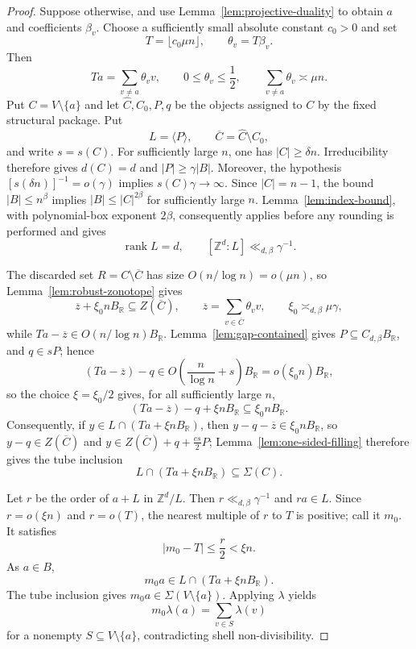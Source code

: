 \documentclass[11pt,reqno]{amsart}
\theoremstyle{definition}
\theoremstyle{remark}
\newcommand{\Z}{\mathbb Z}
\newcommand{\R}{\mathbb R}
\newcommand{\SigmaSet}{\Sigma}
\begin{document}
\begin{proof}
Suppose otherwise, and use Lemma~\ref{lem:projective-duality} to obtain
$a$ and coefficients $\beta_v$.  Choose a sufficiently small absolute
constant $c_0>0$ and set
\[
 T=\lfloor c_0\mu n\rfloor,
 \qquad
 \theta_v=T\beta_v.
\]
Then
\[
 Ta=\sum_{v\ne a}\theta_vv,
 \qquad
 0\le\theta_v\le\frac12,
 \qquad
 \sum_{v\ne a}\theta_v\asymp\mu n.
\]
Put $C=V\setminus\{a\}$ and let
$\widehat C,C_0,P,q$ be the objects assigned to $C$ by the fixed structural
package.  Put
\[
 L=\langle P\rangle,
 \qquad
 \overline C=\widehat C\setminus C_0,
\]
and write $s=s(C)$.  For sufficiently large $n$, one has $|C|\ge\delta n$.  Irreducibility therefore gives $d(C)=d$ and $|P|\ge\gamma|B|$.  Moreover, the hypothesis $[s(\delta n)]^{-1}=o(\gamma)$ implies
$s(C)\gamma\to\infty$.  Since $|C|=n-1$, the bound $|B|\le n^\beta$
implies $|B|\le|C|^{2\beta}$ for sufficiently large $n$.
Lemma~\ref{lem:index-bound}, with polynomial-box exponent $2\beta$,
consequently applies before any rounding is performed and gives
\[
 \operatorname{rank}L=d,
 \qquad
 [\Z^d:L]\ll_{d,\beta}\gamma^{-1}.
\]

The discarded set $R=C\setminus\overline C$ has size
$O(n/\log n)=o(\mu n)$, so Lemma~\ref{lem:robust-zonotope} gives
\[
 \overline z+\xi_0 nB_{\R}\subseteq Z(\overline C),
 \qquad
 \overline z=\sum_{v\in\overline C}\theta_vv,
 \qquad
 \xi_0\asymp_{d,\beta}\mu\gamma,
\]
while $Ta-\overline z\in O(n/\log n)B_{\R}$.
Lemma~\ref{lem:gap-contained} gives $P\subseteq C_{d,\beta}B_{\R}$, and
$q\in sP$; hence
\[
 (Ta-\overline z)-q
 \in O\!\left(\frac{n}{\log n}+s\right)B_{\R}
 =o(\xi_0 n)B_{\R},
\]
so the choice $\xi=\xi_0/2$ gives, for all sufficiently large $n$,
\[
 (Ta-\overline z)-q+\xi nB_{\R}\subseteq\xi_0nB_{\R}.
\]
Consequently, if $y\in L\cap(Ta+\xi nB_{\R})$, then
$y-q-\overline z\in\xi_0nB_{\R}$, so $y-q\in Z(\overline C)$ and
$y\in Z(\overline C)+q+\frac{cs}{2}P$;
Lemma~\ref{lem:one-sided-filling} therefore gives the tube inclusion
\[
 \boxed{
 L\cap(Ta+\xi nB_{\R})\subseteq\SigmaSet(C).
 }
\tag{$\dagger$}
\]

Let $r$ be the order of $a+L$ in $\Z^d/L$.  Then
$r\ll_{d,\beta}\gamma^{-1}$ and $ra\in L$.  Since
$r=o(\xi n)$ and $r=o(T)$, the nearest multiple of $r$ to $T$ is positive;
call it $m_0$.  It satisfies
\[
 |m_0-T|\le\frac r2<\xi n.
\]
As $a\in B$,
\[
 m_0a\in L\cap(Ta+\xi nB_{\R}).
\]
The tube inclusion gives $m_0a\in\SigmaSet(V\setminus\{a\})$.  Applying $\lambda$ yields
\[
 m_0\lambda(a)=\sum_{v\in S}\lambda(v)
\]
for a nonempty $S\subseteq V\setminus\{a\}$, contradicting shell non-divisibility.
\end{proof}
\end{document}
